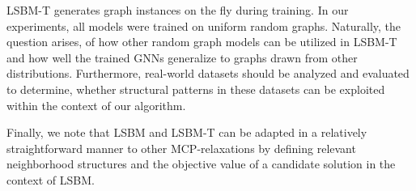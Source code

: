 \documentclass[draft,final]{vutinfth} %
\begin{document}
LSBM-T generates graph instances on the fly during training. In our experiments, all models were trained on uniform random graphs. 
Naturally, the question arises, of how other random graph models can be utilized in LSBM-T and how well the trained GNNs generalize to graphs drawn from other distributions. Furthermore, real-world datasets should be analyzed and evaluated to determine, whether structural patterns in these datasets can be exploited within the context of our algorithm. 

Finally, we note that LSBM and LSBM-T can be adapted in a relatively straightforward manner to other MCP-relaxations by defining relevant neighborhood structures and the objective value of a candidate solution in the context of LSBM. 


\backmatter

\listoffigures %

\cleardoublepage %
\listoftables %

\listofalgorithms
{}

\printindex

\printglossaries



\end{document}
